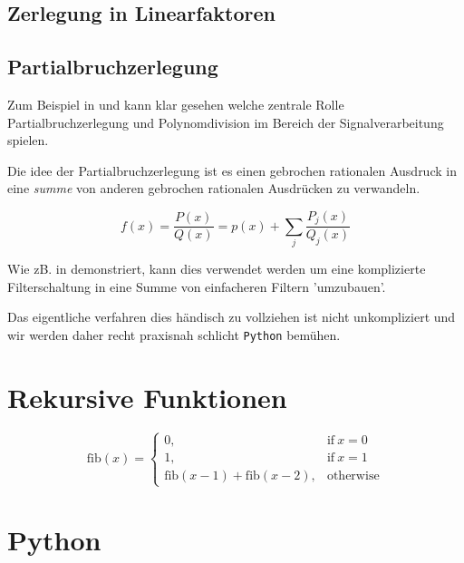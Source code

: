 \subsection{Zerlegung in Linearfaktoren}\label{sec:linearfaktoren}




\subsection{Partialbruchzerlegung}
Zum Beispiel in \cite{liski2019converting} und \cite{freeman2011} kann klar gesehen welche zentrale Rolle Partialbruchzerlegung und Polynomdivision im Bereich der Signalverarbeitung spielen.

Die idee der Partialbruchzerlegung ist es einen gebrochen rationalen Ausdruck in eine \emph{summe} von anderen gebrochen rationalen Ausdrücken zu verwandeln. 

\begin{equation}
{\displaystyle {f(x) = \frac {P(x)}{Q(x)}}=p(x)+\sum _{j}{\frac {P_{j}(x)}{Q_{j}(x)}}}
\end{equation}

Wie zB. in \citep{freeman2011} demonstriert, kann dies verwendet werden um eine komplizierte Filterschaltung in eine Summe von einfacheren Filtern 'umzubauen'.

Das eigentliche verfahren dies händisch zu vollziehen ist nicht unkompliziert und wir werden daher recht praxisnah schlicht \texttt{Python} bemühen.

\section{Rekursive Funktionen}
\begin{equation}
	 \displaystyle \mathrm{fib}(x) = \left\{ \begin{array}{ll} 0, & \mathrm{if} \ x = 0 \\ 1, & \mathrm{if} \ x = 1 \\ \mathrm{fib} \mathopen{}\left( x - 1 \mathclose{}\right) + \mathrm{fib} \mathopen{}\left( x - 2 \mathclose{}\right), & \mathrm{otherwise} \end{array} \right. \label{eq:fib}
\end{equation}

\section{Python}\label{sec:python}

